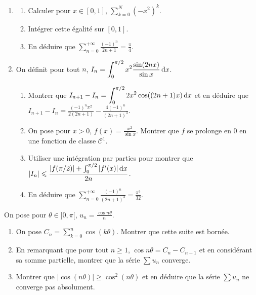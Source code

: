 \begin{exercice}
\begin{enumerate}
    \item
    \begin{enumerate}
        \item Calculer pour $x\in[0,1]$, $\displaystyle\sum_{k=0}^{N}\left(-x^{2}\right)^{k}$.
        \item Intégrer cette égalité sur $[0, 1]$.
        \item En déduire que $\displaystyle\sum_{n=0}^{+\infty}\frac{(-1)^{n}}{2n+1}=\frac{\pi}{4}$.

    \end{enumerate}
    
    \item On définit pour tout $n$, $\displaystyle I_{n}=\int_{0}^{\pi/2}x^{2}\frac{\sin(2nx)}{\sin x} \,\mathrm{d}x$.
    \begin{enumerate}
        \item Montrer que $\displaystyle I_{n+1}-I_{n}=\int_{0}^{\pi/2}2x^{2}\cos((2n+1)x) \,\mathrm{d}x$ 
        et en déduire que $I_{n+1}-I_{n}=\frac{(-1)^{n}\pi^{2}}{2(2n+1)}-\frac{4(-1)^{n}}{(2n+1)^{3}}$.
        \item On pose pour $x>0$, $f(x)=\frac{x^{2}}{\sin x}$. Montrer que $f$ se prolonge en 0 en une fonction de classe $\mathscr C^{1}$.
        \item Utiliser une intégration par parties pour montrer que $\displaystyle|I_{n}|\leqslant\frac{|f(\pi/2)|+\int_{0}^{\pi/2}|f^{\prime}(x)| \,\mathrm{d}x}{2n}$.
        \item En déduire que $\displaystyle\sum_{n=0}^{+\infty}\frac{(-1)^{n}}{(2n+1)^{3}}=\frac{\pi^{3}}{32}$. %
    \end{enumerate}
\end{enumerate}
\end{exercice}

\begin{exercice}
    On pose pour $\theta\in]0,\pi[$, $u_{n}=\frac{\cos n\theta}{n}$.
    \begin{enumerate}
        \item On pose $\displaystyle C_{n}=\sum_{k=0}^{n}\cos(k\theta)$. Montrer que cette suite est bornée.
        \item En remarquant que pour tout $n\geqslant1$, $\cos n\theta=C_{n}-C_{n-1}$ et en considérant sa somme partielle, 
            montrer que la série $\sum u_{n}$ converge.
        \item Montrer que $|\cos(n\theta)|\geqslant \cos^{2}(n\theta)$ et en déduire que la série $\sum u_{n}$ ne converge pas absolument.
    \end{enumerate}
\end{exercice}

